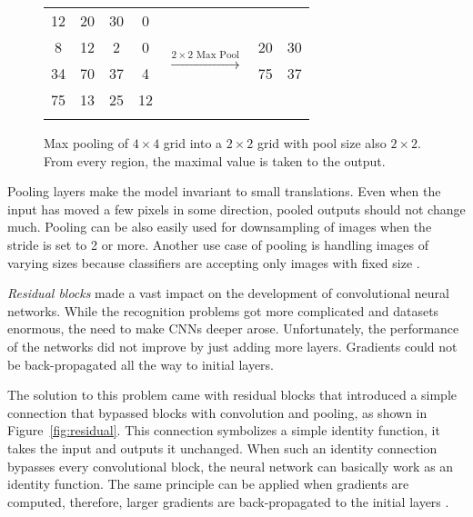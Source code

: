 \begin{figure}[!ht]
    \renewcommand{\arraystretch}{1.6}
    \shorthandoff{-}    %
    \centering
    \begin{tabular}{|c|c|c|c| c c c}
        \hhline{----~~~}
            \cellcolor{red!30}12 & \cellcolor{red!30}20 & \cellcolor{yellow!30}30 & \cellcolor{yellow!30}0 & & & \\ 
        \hhline{----~--}
            \cellcolor{red!30}8 & \cellcolor{red!30}12 & \cellcolor{yellow!30}2 & \cellcolor{yellow!30}0 & \multirow{2}{*}{$\xrightarrow{2 \times 2 \text{ Max Pool}}$} & \multicolumn{1}{|c|}{\cellcolor{red!30}20} & \multicolumn{1}{c|}{\cellcolor{yellow!30}30} \\
        \hhline{----~--}
            \cellcolor{blue!30}34 & \cellcolor{blue!30}70 & \cellcolor{green!30}37 & \cellcolor{green!30}4 & & \multicolumn{1}{|c|}{\cellcolor{blue!30}75} & \multicolumn{1}{c|}{\cellcolor{green!30}37} \\
        \hhline{----~--}
            \cellcolor{blue!30}75 & \cellcolor{blue!30}13 & \cellcolor{green!30}25 & \cellcolor{green!30}12 & & & \\
        \hhline{----~~~}
    \end{tabular}
    \caption{Max pooling of $4 \times 4$ grid into a $2 \times 2$ grid with pool size also $2 \times 2$. From every region, the maximal value is taken to the output.}
    \label{fig:pooling}
\end{figure}

Pooling layers make the model invariant to small translations. Even when the input has moved a few pixels in some direction, pooled outputs should not change much. Pooling can be also easily used for downsampling of images when the stride is set to 2 or more. Another use case of pooling is handling images of varying sizes because classifiers are accepting only images with fixed size \cite{Goodfellow-et-al-2016}.

\textit{Residual blocks} made a vast impact on the development of convolutional neural networks. While the recognition problems got more complicated and datasets enormous, the need to make CNNs deeper arose. Unfortunately, the performance of the networks did not improve by just adding more layers. Gradients could not be back-propagated all the way to initial layers.

The solution to this problem came with residual blocks that introduced a simple connection that bypassed blocks with convolution and pooling, as shown in Figure~\ref{fig:residual}. This connection symbolizes a simple identity function, it takes the input and outputs it unchanged. When such an identity connection bypasses every convolutional block, the neural network can basically work as an identity function. The same principle can be applied when gradients are computed, therefore, larger gradients are back-propagated to the initial layers \cite{he2015deep-resnet}.

